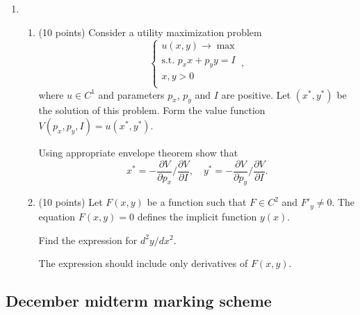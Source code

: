 \begin{enumerate}
\item 
\begin{enumerate}
  \item (10 points) Consider a utility maximization problem
\[
  \begin{cases}
    u(x,y) \to \max \\
    \text{s.t. } p_x x + p_y y  = I \\
      x, y > 0 \\
  \end{cases},
\]
where $u\in C^1$ and parameters $p_x$, $p_y$ and $I$ are positive. 
Let $(x^*, y^*)$ be the solution of this problem. Form the value function
$V(p_x, p_y, I) = u(x^*, y^*)$. 

Using appropriate envelope theorem show that 
\[
  x^* = - \frac{\partial V}{\partial p_x} / \frac{\partial V}{\partial I}, \quad 
  y^* = - \frac{\partial V}{\partial p_y} / \frac{\partial V}{\partial I}.
\]


\item (10 points) Let $F(x,y)$ be a function such that $F\in C^2$ and $F'_y  \neq 0$. 
The equation $F(x, y)=0$ defines the implicit function $y(x)$.

Find the expression for $d^2 y / dx^2$.

The expression should include only derivatives of $F(x,y)$.
\end{enumerate}


\end{enumerate}

    



\subsection{December midterm marking scheme}

